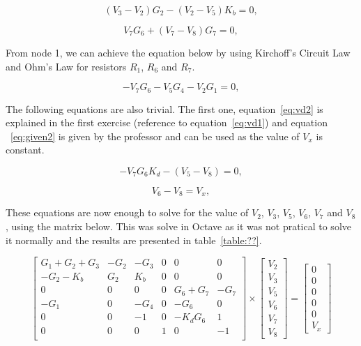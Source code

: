 \begin{equation}
  (V_{3} - V_{2})G_{2} - (V_{2} - V_{5})K_{b} = 0,
  \label{eq:node23}
\end{equation}

\begin{equation}
  V_{7}G_{6} + (V_{7} - V_{8})G_{7} = 0,
  \label{eq:node27}
\end{equation}

From node 1, we can achieve the equation below by using Kirchoff's Circuit Law and Ohm's Law for resistors $R_1$, $R_6$ and $R_7$.

\begin{equation}
  -V_{7}G_{6} - V_{5}G_{4} - V_{2}G_{1} = 0,
  \label{eq:node21}
\end{equation}


The following equations are also trivial. The first one, equation~\ref{eq:vd2} is explained in the first exercise (reference to equation~\ref{eq:vd1}) and equation ~\ref{eq:given2} is given by the professor and can be used as the value of $V_x$ is constant.

\begin{equation}
  -V_{7}G_{6}K_{d} - (V_{5} - V_{8}) = 0,
  \label{eq:vd2}
\end{equation}


\begin{equation}
  V_{6} - V_{8} = V_{x},
  \label{eq:given2}
\end{equation}

These equations are now enough to solve for the value of $V_2$, $V_3$, $V_5$, $V_6$, $V_7$ and $V_8$, using the matrix below. This was solve in Octave as it was not pratical to solve it normally and the results are presented in table~\ref{table:??}.

\begin{equation}
\left[ \begin{array}{cccccc} 
		G_1+G_2+G_3 & -G_2 & -G_3 & 0 & 0 & 0 \\
		-G_2-K_b & G_2 & K_b & 0 & 0 & 0 \\ 
		0 & 0 & 0 & 0 & G_6+G_7 & -G_7  \\ 
		-G_1 & 0 & -G_4 & 0 & -G_6 & 0  \\ 
		0 & 0 & -1 & 0 & -K_dG_6 & 1 \\ 
		0 & 0 & 0 & 1 & 0 & -1 \\ 
\end{array} \right]
\times \left[ \begin{array}{c} V_2 \\ V_3 \\  V_5 \\ V_6 \\ V_7 \\ V_8 \end{array} \right] =
\left[ \begin{array}{c} 0 \\ 0 \\ 0 \\ 0 \\ 0 \\ V_x  \end{array} \right]
\label{eq:nodalmatrix2}
\end{equation}

